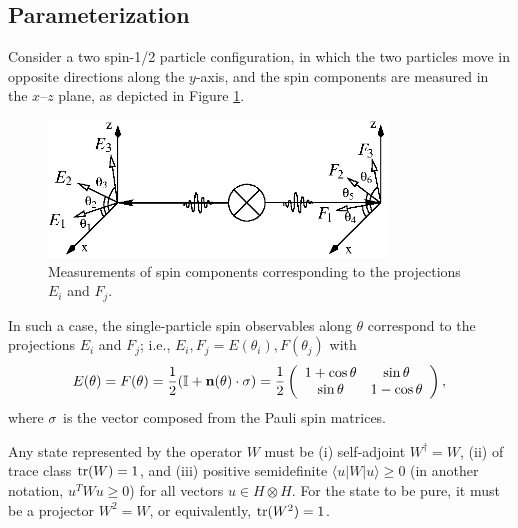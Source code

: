 \subsection{Parameterization}

Consider a two spin-1/2 particle configuration,
in which the two particles move in opposite directions along the $y$-axis,
and the spin components are measured in the $x$--$z$ plane,
as depicted in Figure \ref{f-2003-qpoly-1}.
\begin{figure}%
  \centering
\includegraphics[width=90mm]{2003-qpoly-eifj}
  \caption{Measurements of spin components corresponding to the projections  ${E}_i$ and ${F}_j$.}
  \label{f-2003-qpoly-1}
\end{figure}
In such a case, the single-particle
 spin observables along $\theta$ correspond to the projections
$E_{i}$ and $F_{j}$; i.e., $E_i,F_j=E(\theta_i),F(\theta_j)$ with
\begin{equation}
  \label{e-2003-qpoly-1}
E(\theta )=F(\theta )=\frac{1}{2}({\Bbb I} +{\bf n}(\theta)\cdot{\bf \sigma})=
\frac{1}{2}\left(
  \begin{array}{cc}
    1 + \cos\theta& \sin\theta\\
    \sin\theta&1 - \cos\theta
    \end{array}
\right),
\end{equation}
where ${\bf \sigma}$ is the vector composed from the Pauli spin matrices.

Any state represented by the operator $W$ must be
(i) self-adjoint $W^\dagger =W$,
(ii) of trace class ${\rm tr} (W)=1$, and
(iii) positive semidefinite
$\langle u | W | u \rangle \ge 0$
(in another notation, $u^TWu\ge 0$)
for all vectors $u\in H\otimes H$.
For the state to be pure, it must be a projector $W^2=W$,
or equivalently, ${\rm tr}(W^2)=1$.

